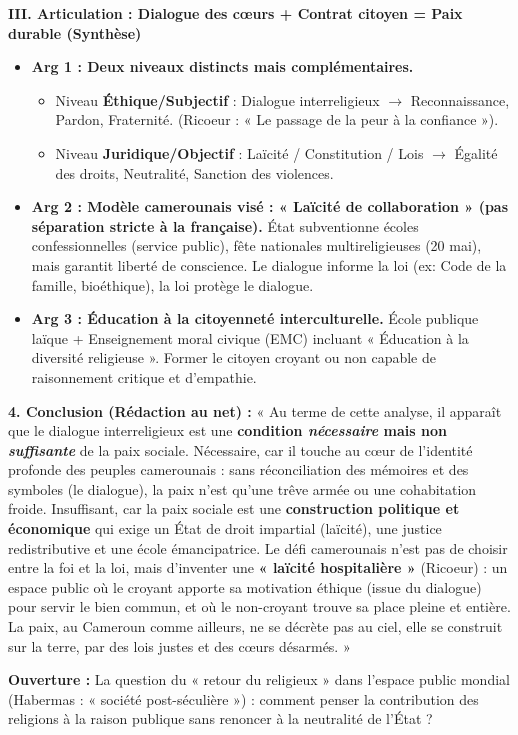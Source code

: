 \documentclass[11pt]{article}
\newcommand{\cle}[1]{{\popxbold\color{popdark}#1}}
\begin{document}
\begin{exoresolu}
\textbf{III. Articulation : Dialogue des cœurs + Contrat citoyen = Paix durable (Synthèse)}
\begin{itemize}
    \item \textbf{Arg 1 : Deux niveaux distincts mais complémentaires.}
    \begin{itemize}
        \item Niveau \textbf{Éthique/Subjectif} : Dialogue interreligieux $\rightarrow$ \cle{Reconnaissance}, \cle{Pardon}, \cle{Fraternité}. (Ricoeur : « Le passage de la peur à la confiance »).
        \item Niveau \textbf{Juridique/Objectif} : Laïcité / Constitution / Lois $\rightarrow$ \cle{Égalité des droits}, \cle{Neutralité}, \cle{Sanction des violences}.
    \end{itemize}
    \item \textbf{Arg 2 : Modèle camerounais visé : « Laïcité de collaboration » (pas séparation stricte à la française).} État subventionne écoles confessionnelles (service public), fête nationales multireligieuses (20 mai), mais garantit liberté de conscience. Le dialogue informe la loi (ex: Code de la famille, bioéthique), la loi protège le dialogue.
    \item \textbf{Arg 3 : Éducation à la citoyenneté interculturelle.} École publique laïque + Enseignement moral civique (EMC) incluant « Éducation à la diversité religieuse ». Former le \cle{citoyen croyant ou non} capable de \cle{raisonnement critique} et d'\cle{empathie}.
\end{itemize}

\textbf{4. Conclusion (Rédaction au net) :}
« Au terme de cette analyse, il apparaît que le dialogue interreligieux est une \textbf{condition \emph{nécessaire} mais non \emph{suffisante}} de la paix sociale. Nécessaire, car il touche au cœur de l'identité profonde des peuples camerounais : sans réconciliation des mémoires et des symboles (le dialogue), la paix n'est qu'une trêve armée ou une cohabitation froide. Insuffisant, car la paix sociale est une \textbf{construction politique et économique} qui exige un État de droit impartial (laïcité), une justice redistributive et une école émancipatrice. Le défi camerounais n'est pas de choisir entre la foi et la loi, mais d'inventer une \textbf{« laïcité hospitalière »} (Ricoeur) : un espace public où le croyant apporte sa motivation éthique (issue du dialogue) pour servir le bien commun, et où le non-croyant trouve sa place pleine et entière. La paix, au Cameroun comme ailleurs, ne se décrète pas au ciel, elle se construit sur la terre, par des lois justes et des cœurs désarmés. »

\textbf{Ouverture :} La question du « retour du religieux » dans l'espace public mondial (Habermas : « société post-séculière ») : comment penser la contribution des religions à la raison publique sans renoncer à la neutralité de l'État ?
\end{exoresolu}
\end{document}
